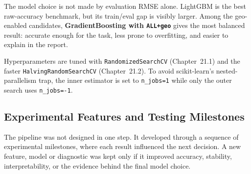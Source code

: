 \documentclass[11pt,a4paper]{article}
\begin{document}
The model choice is not made by evaluation RMSE alone. LightGBM is the best raw-accuracy benchmark, but its train/eval gap is visibly larger. Among the geo-enabled candidates, \textbf{GradientBoosting with \texttt{ALL+geo}} gives the most balanced result: accurate enough for the task, less prone to overfitting, and easier to explain in the report.

Hyperparameters are tuned with \texttt{RandomizedSearchCV} (Chapter~21.1) and the faster \texttt{HalvingRandomSearchCV} (Chapter~21.2). To avoid scikit-learn's nested-parallelism trap, the inner estimator is set to \texttt{n\_jobs=1} while only the outer search uses \texttt{n\_jobs=-1}.

\subsection{Experimental Features and Testing Milestones}
The pipeline was not designed in one step. It developed through a sequence of experimental milestones, where each result influenced the next decision. A new feature, model or diagnostic was kept only if it improved accuracy, stability, interpretability, or the evidence behind the final model choice.
\end{document}
